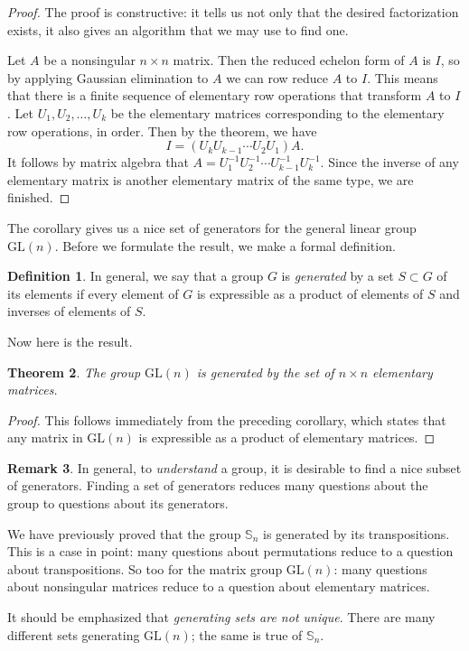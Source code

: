 \documentclass[11pt]{article}
\newtheorem{thm}{Theorem}[section]
\theoremstyle{definition}
\newtheorem{defn}[thm]{Definition}
\newtheorem{rmk}[thm]{Remark}
\newcommand{\GL}{\mathrm{GL}}
\newcommand{\Sym}{\mathbb{S}}
\begin{document}
\begin{proof}
The proof is constructive: it tells us not only that the desired
factorization exists, it also gives an algorithm that we may use to
find one. 

Let $A$ be a nonsingular $n \times n$ matrix. Then the reduced echelon
form of $A$ is $I$, so by applying Gaussian elimination to $A$ we can
row reduce $A$ to $I$. This means that there is a finite sequence of
elementary row operations that transform $A$ to $I$. Let $U_1, U_2,
\dots, U_k$ be the elementary matrices corresponding to the elementary
row operations, in order. Then by the theorem, we have 
\[
  I = (U_k U_{k-1} \cdots U_2 U_1) A.
\]
It follows by matrix algebra that $A = U_1^{-1} U_2^{-1} \cdots
U_{k-1}^{-1} U_k^{-1}$. Since the inverse of any elementary matrix is
another elementary matrix of the same type, we are finished.
\end{proof}

The corollary gives us a nice set of generators for the general linear
group $\GL(n)$. Before we formulate the result, we make a formal
definition.

 
\begin{defn}
In general, we say that a group $G$ is \emph{generated} by a set $S
\subset G$ of its elements if every element of $G$ is expressible as a
product of elements of $S$ and inverses of elements of $S$.
\end{defn}

Now here is the result.

\begin{thm}
  The group $\GL(n)$ is generated by the set of $n \times n$
  elementary matrices.
\end{thm}

\begin{proof}
This follows immediately from the preceding corollary, which states
that any matrix in $\GL(n)$ is expressible as a product of elementary
matrices.
\end{proof}


\begin{rmk}
In general, to \emph{understand} a group, it is desirable to find a
nice subset of generators. Finding a set of generators reduces many
questions about the group to questions about its generators.

We have previously proved that the group $\Sym_n$ is generated by its
transpositions. This is a case in point: many questions about
permutations reduce to a question about transpositions. So too for the
matrix group $\GL(n)$: many questions about nonsingular matrices
reduce to a question about elementary matrices.

It should be emphasized that \emph{generating sets are not
  unique}. There are many different sets generating $\GL(n)$; the same
is true of $\Sym_n$.
\end{rmk}
\end{document}
